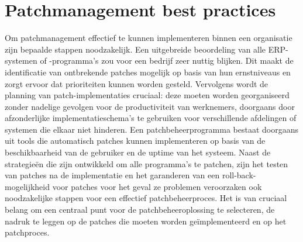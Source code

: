 \section{Patchmanagement best practices}
Om patchmanagement effectief te kunnen implementeren binnen een organisatie zijn bepaalde stappen noodzakelijk. Een uitgebreide beoordeling van alle 
ERP-systemen of -programma's zou voor een bedrijf zeer nuttig blijken. Dit maakt de identificatie van ontbrekende patches mogelijk op basis van hun 
ernstniveaus en zorgt ervoor dat prioriteiten kunnen worden gesteld. Vervolgens wordt de planning van patch-implementaties cruciaal: deze moeten worden 
georganiseerd zonder nadelige gevolgen voor de productiviteit van werknemers, doorgaans door afzonderlijke implementatieschema's te gebruiken voor verschillende 
afdelingen of systemen die elkaar niet hinderen. Een patchbeheerprogramma bestaat doorgaans uit tools die automatisch patches kunnen implementeren op basis 
van de beschikbaarheid van de gebruiker en de uptime van het systeem. Naast de strategieën die zijn ontwikkeld om alle programma's te patchen, zijn het 
testen van patches na de implementatie en het garanderen van een roll-back-mogelijkheid voor patches voor het geval ze problemen veroorzaken ook noodzakelijke 
stappen voor een effectief patchbeheerproces. Het is van cruciaal belang om een ​​centraal punt voor de patchbeheeroplossing te selecteren, de nadruk te leggen 
op de patches die moeten worden geïmplementeerd en op het patchproces. \autocite{ManageEngine2024}


